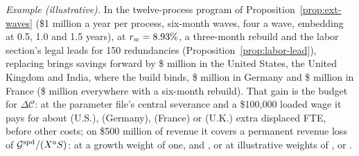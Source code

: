 \noindent\emph{Example (illustrative).} In the twelve-process program of Proposition~\ref{prop:ext-waves} (\$1 million a year per process, six-month waves, four a wave, embedding at 0.5, 1.0 and 1.5 years), at $r_w=8.93\%$, a three-month rebuild and the labor section's legal leads for 150 redundancies (Proposition~\ref{prop:labor-lead}), replacing brings savings forward by \$\acqRpGainUS{} million in the United States, the United Kingdom and India, where the build binds, \$\acqRpGainDE{} million in Germany and \$\acqRpGainFR{} million in France (\$\acqRpGainHalf{} million everywhere with a six-month rebuild). That gain is the budget for $\Delta\mathcal C$: at the parameter file's central severance and a \$100{,}000 loaded wage it pays for about \acqRpFteUS{} (U.S.), \acqRpFteDE{} (Germany), \acqRpFteFR{} (France) or \acqRpFteUK{} (U.K.) extra displaced FTE, before other costs; on \$500 million of revenue it covers a permanent revenue loss of $\mathcal G^{\rm spd}/(X^{\mathsf o}S)$: \acqRpCustOne{} at a growth weight of one, and \acqRpCustXbOne, \acqRpCustXbTwo{} or \acqRpCustXbThree{} at illustrative weights of \acqXbOne, \acqXbTwo{} or \acqXbThree. %
